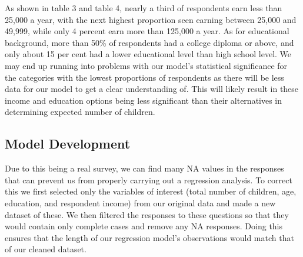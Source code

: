 \documentclass[
]{article}
\newenvironment{Shaded}{\begin{snugshade}}{\end{snugshade}}
\newcommand{\KeywordTok}[1]{\textcolor[rgb]{0.13,0.29,0.53}{\textbf{#1}}}
\newcommand{\NormalTok}[1]{#1}
\newcommand{\OperatorTok}[1]{\textcolor[rgb]{0.81,0.36,0.00}{\textbf{#1}}}
\newcommand{\StringTok}[1]{\textcolor[rgb]{0.31,0.60,0.02}{#1}}
\begin{document}
As shown in table 3 and table 4, nearly a third of respondents earn less
than 25,000 a year, with the next highest proportion seen earning
between 25,000 and 49,999, while only 4 percent earn more than 125,000 a
year. As for educational background, more than 50\% of respondents had a
college diploma or above, and only about 15 per cent had a lower
educational level than high school level. We may end up running into
problems with our model's statistical significance for the categories
with the lowest proportions of respondents as there will be less data
for our model to get a clear understanding of. This will likely result
in these income and education options being less significant than their
alternatives in determining expected number of children.

\hypertarget{model-development}{%
\subsection{Model Development}\label{model-development}}

Due to this being a real survey, we can find many NA values in the
responses that can prevent us from properly carrying out a regression
analysis. To correct this we first selected only the variables of
interest (total number of children, age, education, and respondent
income) from our original data and made a new dataset of these. We then
filtered the responses to these questions so that they would contain
only complete cases and remove any NA responses. Doing this ensures that
the length of our regression model's observations would match that of
our cleaned dataset.

\begin{Shaded}
\end{Shaded}
\end{document}

